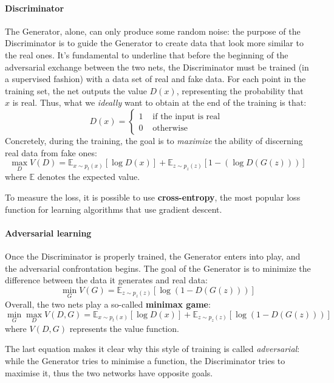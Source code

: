 \documentclass[12pt,a4paper]{book}
\theoremstyle{definition}
\begin{document}
	\paragraph{Discriminator}
	The Generator, alone, can only produce some random noise: the purpose of the Discriminator is to guide the Generator to create data that look more similar to the real ones. It's fundamental to underline that before the beginning of the adversarial exchange between the two nets, the Discriminator must be trained (in a supervised fashion) with a data set of real and fake data.
	For each point in the training set, the net outputs the value $D(x)$, representing the probability that $x$ is real. Thus, what we \textit{ideally} want to obtain at the end of the training is that:
	\[
	D(x) = \begin{cases}
		1 &\text{ if the input is real }\\
		0 & \text{ otherwise }
	\end{cases}
	\]
	Concretely, during the training, the goal is to \textit{maximize} the ability of discerning real data from fake ones:
	\[
	\max_D V(D) = \mathbb{E}_{x\sim p_t(x)}[\log D(x)] + \mathbb{E}_{z\sim p_z(z)}[1-(\log D(G(z)))]
	\]
	where $\mathbb{E}$ denotes the expected value.
	
	To measure the loss, it is possible to use \textbf{cross-entropy}, the most popular loss function for learning algorithms that use gradient descent.
	\paragraph{Adversarial learning}
	Once the Discriminator is properly trained, the Generator enters into play, and the adversarial confrontation begins. The goal of the Generator is to minimize the difference between the data it generates and real data:
	\[
	\min_G V(G) = \mathbb{E}_{z\sim p_z(z)}[\log(1-D(G(z)))]
	\]
	Overall, the two nets play a so-called \textbf{minimax game}:
	\[
	\min_G \max_D V(D,G) = \mathbb{E}_{x\sim p_t(x)}[\log D(x)] + \mathbb{E}_{z\sim p_z(z)}[\log (1-D(G(z)))]
	\]
	where $V(D,G)$ represents the value function.
	
	The last equation makes it clear why this style of training is called \textit{adversarial}: while the Generator tries to minimise a function, the Discriminator tries to maximise it, thus the two networks have opposite goals. %
	
\end{document}
